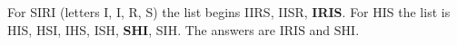For SIRI (letters I, I, R, S) the list begins IIRS, IISR, \textbf{IRIS}. For HIS the list is HIS, HSI, IHS, ISH, \textbf{SHI}, SIH. The answers are $\boxed{\text{IRIS}}$ and $\boxed{\text{SHI}}$.
